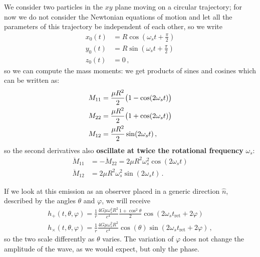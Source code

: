 \documentclass[main.tex]{subfiles}
\begin{document}
We consider two particles in the \(xy\) plane moving on a circular trajectory; for now we do not consider the Newtonian equations of motion and let all the parameters of this trajectory be independent of each other, so we write 
%
\begin{subequations}
\begin{align}
x_0 (t) &= R \cos(\omega_{s} t + \frac{\pi}{2}) \\
y_0 (t) &= R \sin(\omega_{s} t + \frac{\pi}{2}) \\
z_0 (t) &= 0
\,,
\end{align}
\end{subequations}
%
so we can compute the mass moments: we get products of sines and cosines which can be written as:
%
\begin{align}
M_{11} &= \frac{\mu R^2}{2} \qty(1 - \cos(2 \omega_{s}t)) \\
M_{22} &= \frac{\mu R^2}{2} \qty(1 + \cos(2 \omega_{s}t)) \\
M_{12} &= \frac{\mu R^2}{2} \sin(2 \omega_{s}t) 
\,,
\end{align}
%
so the second derivatives also \textbf{oscillate at twice the rotational frequency} \(\omega_{s}\):
%
\begin{subequations} \label{eq:second-mass-moment-xy-components}
\begin{align}
\ddot{M}_{11} &= - \ddot{M}_{22} = 2 \mu R^2 \omega_{s}^2 \cos(2 \omega_{s}t)  \\
\ddot{M}_{12} &= 2 \mu R^2\omega_{s}^2  \sin( 2 \omega_{s}t)
\,.
\end{align}
\end{subequations}

If we look at this emission as an observer placed in a generic direction \(\hat{n}\), described by the angles \(\theta \) and \(\varphi \), we will receive 
%
\begin{subequations}
\begin{align}
h_{+} (t, \theta , \varphi ) = \frac{1}{r} \frac{4G \mu \omega_{s}^2 R^2}{c^{4}} \frac{1 + \cos^2\theta }{2} \cos(2 \omega_{s}t _{\text{ret}} + 2 \varphi  ) \\
h_{ \times } (t, \theta , \varphi ) = \frac{1}{r} \frac{4G \mu \omega_{s}^2 R^2}{c^{4}} \cos(\theta ) \sin(2 \omega_{s}t _{\text{ret}} + 2 \varphi  )
\,,
\end{align}
\end{subequations}
%
so the two scale differently as \(\theta \) varies.
The variation of \(\varphi \) does not change the amplitude of the wave, as we would expect, but only the phase.
\end{document}
